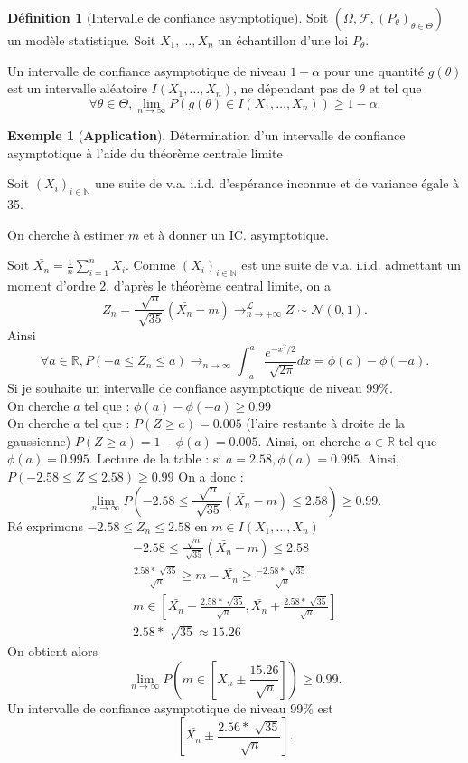 \documentclass{article}
\theoremstyle{plain}%
\theoremstyle{definition}
\newtheorem{defn}{Définition}[section]
\newtheorem{exmp}{Exemple}[section]
\theoremstyle{remark}
\begin{document}
\begin{defn}[Intervalle de confiance asymptotique]
    Soit $ (\Omega , \mathcal{F}, (P_\theta )_{\theta \in \Theta }) $ un modèle statistique. Soit $ X_1, \dots, X_n $ un échantillon d'une loi $ P_\theta  $. 

    Un intervalle de confiance asymptotique de niveau $ 1 - \alpha  $ pour une quantité $ g(\theta ) $ est un intervalle aléatoire $ I(X_1, \dots, X_n) $, ne dépendant pas de $ \theta  $ et tel que 
    \[
        \forall \theta \in \Theta, \lim_{n \to \infty}  P(g(\theta ) \in I(X_1, \dots, X_n)) \geq 1-\alpha 
    .\]
\end{defn}
\begin{exmp}[\textbf{Application}]
    Détermination d'un intervalle de confiance asymptotique à l'aide du théorème centrale limite 

    Soit $ (X_i)_{i \in \mathbb{N}} $ une suite de v.a. i.i.d. d'espérance inconnue et de variance égale à 35. 

    On cherche à estimer $ m $ et à donner un IC. asymptotique.

    Soit $ \bar{X_n} = \frac{1}{n}\sum_{i=1}^{n}X_i $. Comme $ (X_i)_{i \in \mathbb{N}} $ est une suite de v.a. i.i.d. admettant un moment d'ordre 2, d'après le théorème central limite, on a 
    \[
        Z_n = \frac{\sqrt[]{n}}{\sqrt[]{35}}(\bar{X_n}-m) \to_{n \to +\infty }^\mathcal{L} Z \sim \mathcal{N}(0,1)
    .\]
    Ainsi 
    \[
        \forall a \in \mathbb{R}, P(-a \leq Z_n \leq a) \to_{n \to \infty } \int_{-a}^{a}\frac{e^{-x^2 /2}}{\sqrt[]{2 \pi }}dx = \phi (a) - \phi (-a)
    .\]
    Si je souhaite un intervalle de confiance asymptotique de niveau 99\%. \\
    On cherche $ a $ tel que : $ \phi(a) - \phi (-a) \geq 0.99 $ \\
    On cherche $ a $ tel que : $ P(Z \geq a) = 0.005 $ (l'aire restante à droite de la gaussienne) $ P(Z \geq a) = 1 - \phi (a) = 0.005 $.
    Ainsi, on cherche $ a \in \mathbb{R} $ tel que $ \phi (a) = 0.995 $. Lecture de la table : si $ a=2.58, \phi (a) = 0.995 $. Ainsi, $ P(-2.58 \leq Z \leq 2.58) \geq 0.99 $ On a donc :
    \[
        \lim_{n \to \infty} P(-2.58 \leq \frac{\sqrt[]{n}}{\sqrt[]{35}} (\bar{X_n} - m ) \leq 2.58) \geq 0.99
    .\]
    Ré exprimons $ -2.58 \leq Z_n \leq 2.58 $ en $ m \in I(X_1, \dots, X_n) $
    \begin{align*}
        -2.58 \leq \frac{\sqrt[]{n}}{\sqrt[]{35}} (\bar{X_n} - m ) \leq 2.58 \\
        \frac{2.58 * \sqrt[]{35}}{\sqrt[]{n}} \geq m - \bar{X_n} \geq \frac{-2.58* \sqrt[]{35}}{\sqrt[]{n}} \\
        m \in [\bar{X_n} - \frac{2.58 * \sqrt[]{35}}{\sqrt[]{n}} , \bar{X_n} + \frac{2.58 * \sqrt[]{35}}{\sqrt[]{n}}]\\
        2.58 * \sqrt[]{35} \approx 15.26
    \end{align*}
    On obtient alors 
    \[
        \lim_{n \to \infty} P(m \in [\bar{X_n} \pm  \frac{15.26}{\sqrt[]{n}}]) \geq 0.99
    .\]
    Un intervalle de confiance asymptotique de niveau 99\% est 
    \[
        [\bar{X_n} \pm \frac{2.56 * \sqrt[]{35}}{\sqrt[]{n}}]
    .\]
\end{exmp}
\end{document}

